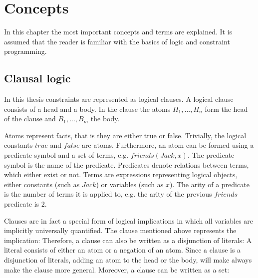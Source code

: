 \chapter{Concepts}
\label{cha:bg}

In this chapter the most important concepts and terms are explained. It is assumed that the reader is familiar with the basics of logic and constraint programming.

\section{Clausal logic}
In this thesis constraints are represented as logical clauses. A logical clause consists of a head and a body. In the clause the atoms $H_1, ..., H_n$ form the head of the clause and $B_1, ..., B_m$ the body. 

Atoms represent facts, that is they are either true or false. Trivially, the logical constants $true$ and $false$ are atoms. Furthermore, an atom can be formed using a predicate symbol and a set of terms, e.g. $friends(Jack, x)$. The predicate symbol is the name of the predicate. Predicates denote relations between terms, which either exist or not. Terms are expressions representing logical objects, either constants (such as $Jack$) or variables (such as $x$). The arity of a predicate is the number of terms it is applied to, e.g. the arity of the previous $friends$ predicate is $2$.

Clauses are in fact a special form of logical implications in which all variables are implicitly universally quantified. The clause mentioned above represents the implication:  Therefore, a clause can also be written as a disjunction of literals:  A literal consists of either an atom or a negation of an atom. Since a clause is a disjunction of literals, adding an atom to the head or the body, will make always make the clause more general. Moreover, a clause can be written as a set: 


